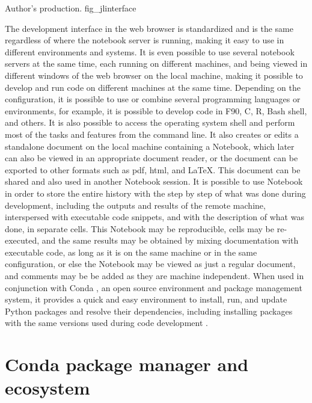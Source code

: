      {Author's production.} {fig_jlinterface}


The development interface in the web browser is standardized and is the same regardless of where the notebook server is running, making it easy to use in different environments and systems. It is even possible to use several notebook servers at the same time, each running on different machines, and being viewed in different windows of the web browser on the local machine, making it possible to develop and run code on different machines at the same time. Depending on the configuration, it is possible to use or combine several programming languages or environments, for example, it is possible to develop code in F90, C, R, Bash shell, and others. It is also possible to access the operating system shell and perform most of the tasks and features from the command line. It also creates or edits a standalone document on the local machine containing a Notebook, which later can also be viewed in an appropriate document reader, or the document can be exported to other formats such as pdf, html, and LaTeX. This document can be shared and also used in another Notebook session. It is possible to use Notebook in order to store the entire history with the step by step of what was done during development, including the outputs and results of the remote machine, interspersed with executable code snippets, and with the description of what was done, in separate cells. This Notebook may be reproducible, cells may be re-executed, and the same results may be obtained by mixing documentation with executable code, as long as it is on the same machine or in the same configuration, or else the Notebook may be viewed as just a regular document, and comments may be be added as they are machine independent. When used in conjunction with Conda \cite {Gruening2018}, an open source environment and package management system, it provides a quick and easy environment to install, run, and update Python packages and resolve their dependencies, including installing packages with the same versions used during code development \cite {Bisong2019}.

%
%
%
\section{Conda package manager and ecosystem}
\label{sec_conda}

